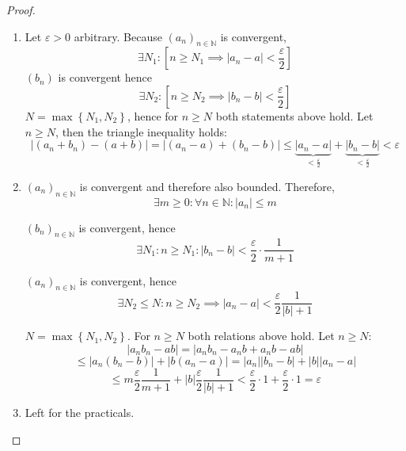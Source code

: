 \documentclass[a4paper,landscape,twocolumn]{article}
\theoremstyle{definition}
\newcommand\set[1]{\left\{#1\right\}}
\newcommand\abs[1]{\left|#1\right|}
\newcommand\seq[1]{{\left(#1\right)}_{n \in \mathbb N}}
\begin{document}
\begin{proof}
  \begin{enumerate}
    \item Let $\varepsilon > 0$ arbitrary. Because $(a_n)_{n \in \mathbb N}$ is convergent,
      \[ \exists N_1: \left[n \geq N_1 \implies \abs{a_n - a} < \frac{\varepsilon}{2}\right] \]
      $(b_n)$ is convergent hence
      \[ \exists N_2: \left[n \geq N_2 \implies \abs{b_n - b} < \frac{\varepsilon}2\right] \]
      $N = \max\set{N_1, N_2}$, hence for $n \geq N$ both statements above hold.
      Let $n \geq N$, then the triangle inequality holds:
      \[
          \abs{(a_n + b_n) - (a + b)}
          = \abs{(a_n - a) + (b_n - b)}
          \leq \underbrace{\abs{a_n - a}}_{<\frac\varepsilon2} + \underbrace{\abs{b_n - b}}_{<\frac\varepsilon2} < \varepsilon
      \]

    \item $(a_n)_{n \in \mathbb N}$ is convergent and therefore also bounded. Therefore,
      \[ \exists m \geq 0: \forall n \in \mathbb N: \abs{a_n} \leq m \]

      $\seq{b_n}$ is convergent, hence
      \[ \exists N_1: n \geq N_1: \abs{b_n - b} < \frac\varepsilon2 \cdot \frac1{m+1} \]

      $(a_n)_{n \in \mathbb N}$ is convergent, hence
      \[ \exists N_2 \leq N: n \geq N_2 \implies \abs{a_n - a} < \frac\varepsilon2 \frac{1}{\abs{b} + 1} \]

      $N = \max\set{N_1, N_2}$. For $n \geq N$ both relations above hold.
      Let $n \geq N:$
      \[
          \abs{a_n b_n - ab}
          = \abs{a_n b_n - a_n b + a_n b - ab}
      \] \[
          \leq \abs{a_n (b_n - b)} + \abs{b(a_n - a)} = \abs{a_n} \abs{b_n - b} + \abs{b} \abs{a_n - a}
      \] \[
          \leq m \frac{\varepsilon}{2} \frac{1}{m+1} + \abs{b} \frac{\varepsilon}{2} \frac{1}{\abs{b} + 1} < \frac{\varepsilon}{2} \cdot 1 + \frac{\varepsilon}{2} \cdot 1 = \varepsilon
      \]
    \item Left for the practicals.
  \end{enumerate}
\end{proof}
\end{document}
